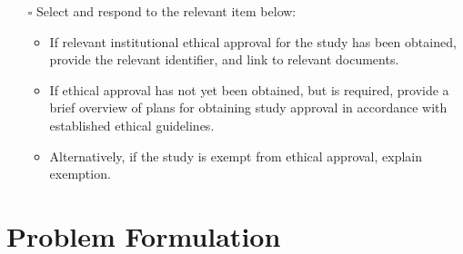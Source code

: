 \documentclass[
]{article}
\providecommand{\tightlist}{%
  \setlength{\itemsep}{0pt}\setlength{\parskip}{0pt}}\usepackage{longtable,booktabs,array}
\begin{document}
\begin{tcolorbox}[enhanced jigsaw, rightrule=.15mm, titlerule=0mm, coltitle=black, opacityback=0, bottomrule=.15mm, colback=white, opacitybacktitle=0.6, title=\textcolor{quarto-callout-caution-color}{\faFire}\hspace{0.5em}{Preregistration Item}, toprule=.15mm, colframe=quarto-callout-caution-color-frame, left=2mm, leftrule=.75mm, breakable, bottomtitle=1mm, colbacktitle=quarto-callout-caution-color!10!white, toptitle=1mm, arc=.35mm]

\begin{itemize}
\tightlist
\item[$\square$]
  Select and respond to the relevant item below:

  \begin{itemize}
  \tightlist
  \item
    If relevant institutional ethical approval for the study has been
    obtained, provide the relevant identifier, and link to relevant
    documents.
  \item
    If ethical approval has not yet been obtained, but is required,
    provide a brief overview of plans for obtaining study approval in
    accordance with established ethical guidelines.
  \item
    Alternatively, if the study is exempt from ethical approval, explain
    exemption.
  \end{itemize}
\end{itemize}

\end{tcolorbox}

\section{Problem Formulation}\label{sec-problem-formulation}
\end{document}
